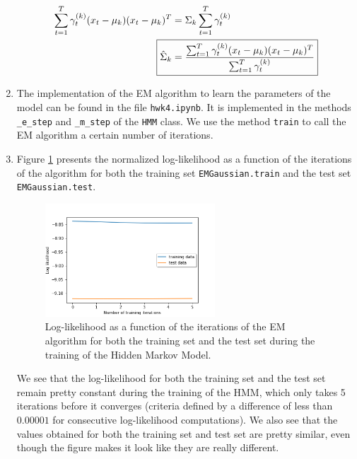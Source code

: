 \documentclass[11pt]{article}
\begin{document}
\begin{enumerate}
\begin{align*}
\sum_{t=1}^{T} \gamma_{t} ^{(k)} (x_t-\mu_k)(x_t-\mu_k)^T & = \Sigma_k \sum_{t=1}^T \gamma_t ^{(k)} \\
\Aboxed{\hat{\Sigma}_k & = \frac{\sum_{t=1}^{T} \gamma_{t} ^{(k)} (x_t-\mu_k)(x_t-\mu_k)^T}{\sum_{t=1}^T \gamma_t ^{(k)}}}
\end{align*}

\item %
The implementation of the EM algorithm to learn the parameters of the model can be found in the file \texttt{hwk4.ipynb}. It is implemented in the methods \texttt{\_e\_step} and \texttt{\_m\_step} of the \texttt{HMM} class. We use the method \texttt{train} to call the EM algorithm a certain number of iterations.

\item %
Figure \ref{fig:log_likelihood_hmm} presents the normalized log-likelihood as a function of the iterations of the algorithm for both the training set \texttt{EMGaussian.train} and the test set \texttt{EMGaussian.test}.

\begin{figure}[htbp]
\begin{center}
\includegraphics[width=0.6\textwidth]{figures/log_likelihood_hmm.png}
\caption{Log-likelihood as a function of the iterations of the EM algorithm for both the training set and the test set during the training of the Hidden Markov Model.}
\label{fig:log_likelihood_hmm}
\end{center}
\end{figure}

We see that the log-likelihood for both the training set and the test set remain pretty constant during the training of the HMM, which only takes 5 iterations before it converges (criteria defined by a difference of less than $0.00001$ for consecutive log-likelihood computations). We also see that the values obtained for both the training set and test set are pretty similar, even though the figure makes it look like they are really different.



\end{enumerate}
\end{document}
